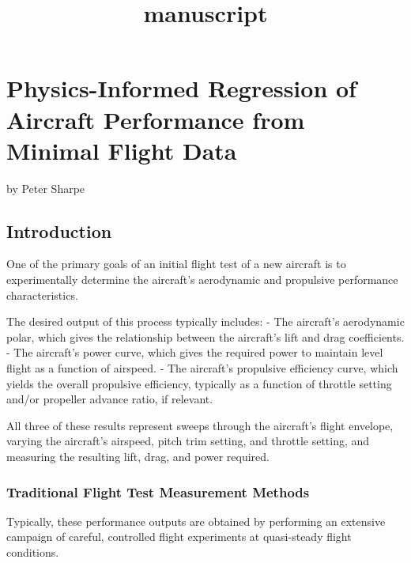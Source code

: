 \documentclass[11pt]{article}
\title{manuscript}
\begin{document}
    
    \maketitle
    
    

    
    \hypertarget{physics-informed-regression-of-aircraft-performance-from-minimal-flight-data}{%
\section{Physics-Informed Regression of Aircraft Performance from
Minimal Flight
Data}\label{physics-informed-regression-of-aircraft-performance-from-minimal-flight-data}}

by Peter Sharpe

    \hypertarget{introduction}{%
\subsection{Introduction}\label{introduction}}

One of the primary goals of an initial flight test of a new aircraft is
to experimentally determine the aircraft's aerodynamic and propulsive
performance characteristics.

The desired output of this process typically includes: - The aircraft's
aerodynamic polar, which gives the relationship between the aircraft's
lift and drag coefficients. - The aircraft's power curve, which gives
the required power to maintain level flight as a function of airspeed. -
The aircraft's propulsive efficiency curve, which yields the overall
propulsive efficiency, typically as a function of throttle setting
and/or propeller advance ratio, if relevant.

All three of these results represent sweeps through the aircraft's
flight envelope, varying the aircraft's airspeed, pitch trim setting,
and throttle setting, and measuring the resulting lift, drag, and power
required.

    \hypertarget{traditional-flight-test-measurement-methods}{%
\subsubsection{Traditional Flight Test Measurement
Methods}\label{traditional-flight-test-measurement-methods}}

Typically, these performance outputs are obtained by performing an
extensive campaign of careful, controlled flight experiments at
quasi-steady flight conditions.
\end{document}
